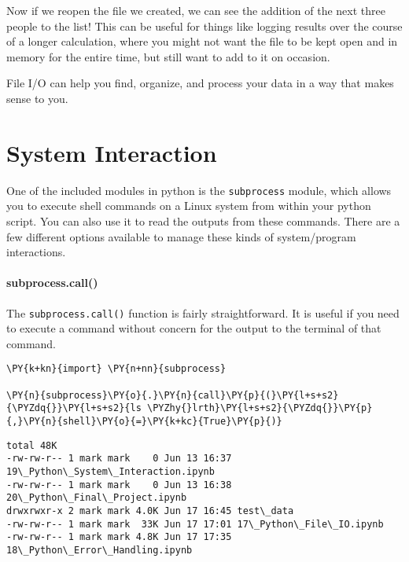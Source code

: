     Now if we reopen the file we created, we can see the addition of the
next three people to the list! This can be useful for things like
logging results over the course of a longer calculation, where you might
not want the file to be kept open and in memory for the entire time, but
still want to add to it on occasion.

File I/O can help you find, organize, and process your data in a way
that makes sense to you.
\section{System Interaction}
One of the included modules in python is the \texttt{subprocess} module,
which allows you to execute shell commands on a Linux system from within
your python script. You can also use it to read the outputs from these
commands. There are a few different options available to manage these
kinds of system/program interactions.

\hypertarget{subprocess.call}{%
\paragraph{subprocess.call()}\label{subprocess.call}}

The \texttt{subprocess.call()} function is fairly straightforward. It is
useful if you need to execute a command without concern for the output
to the terminal of that command.

    \begin{tcolorbox}[breakable, size=fbox, boxrule=1pt, pad at break*=1mm,colback=cellbackground, colframe=cellborder]
\begin{Verbatim}[commandchars=\\\{\}]
\PY{k+kn}{import} \PY{n+nn}{subprocess}

\PY{n}{subprocess}\PY{o}{.}\PY{n}{call}\PY{p}{(}\PY{l+s+s2}{\PYZdq{}}\PY{l+s+s2}{ls \PYZhy{}lrth}\PY{l+s+s2}{\PYZdq{}}\PY{p}{,}\PY{n}{shell}\PY{o}{=}\PY{k+kc}{True}\PY{p}{)}
\end{Verbatim}
\end{tcolorbox}

    \begin{Verbatim}[commandchars=\\\{\}]
total 48K
-rw-rw-r-- 1 mark mark    0 Jun 13 16:37 19\_Python\_System\_Interaction.ipynb
-rw-rw-r-- 1 mark mark    0 Jun 13 16:38 20\_Python\_Final\_Project.ipynb
drwxrwxr-x 2 mark mark 4.0K Jun 17 16:45 test\_data
-rw-rw-r-- 1 mark mark  33K Jun 17 17:01 17\_Python\_File\_IO.ipynb
-rw-rw-r-- 1 mark mark 4.8K Jun 17 17:35 18\_Python\_Error\_Handling.ipynb
    \end{Verbatim}

